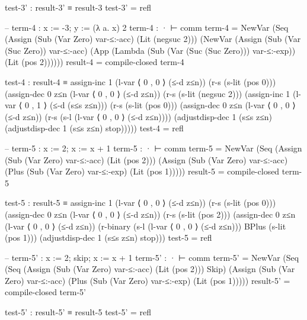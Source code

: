 \documentclass{article}
\begin{document}
\begin{prev}
\begin{code}
test-3' : result-3' ≡ result-3
test-3' = refl


-- term-4 : x := -3; y := (λ a. x) 2
term-4 : · ⊢ comm
term-4 = 
    NewVar 
        (Seq 
            (Assign 
                (Sub (Var Zero) var-≤:-acc) 
                (Lit (negsuc 2)))
            (NewVar 
                (Assign 
                    (Sub (Var (Suc Zero)) var-≤:-acc)
                    (App 
                        (Lambda (Sub (Var (Suc (Suc Zero))) var-≤:-exp))
                        (Lit (pos 2))))))
result-4 = compile-closed term-4

test-4 : result-4 ≡
    assign-inc 1 
    (l-var ⟨ 0 , 0 ⟩ (≤-d z≤n)) 
    (r-s (s-lit (pos 0)))
    (assign-dec 0 z≤n 
        (l-var ⟨ 0 , 0 ⟩ (≤-d z≤n))
        (r-s (s-lit (negsuc 2)))
        (assign-inc 1 
            (l-var ⟨ 0 , 1 ⟩ (≤-d (s≤s z≤n)))
            (r-s (s-lit (pos 0)))
            (assign-dec 0 z≤n 
                (l-var ⟨ 0 , 0 ⟩ (≤-d z≤n))
                (r-s (s-l (l-var ⟨ 0 , 0 ⟩ (≤-d z≤n))))
                (adjustdisp-dec 1 (s≤s z≤n)
                    (adjustdisp-dec 1 (s≤s z≤n) stop)))))
test-4 = refl


-- term-5 : x := 2; x := x + 1
term-5 : · ⊢ comm
term-5 = 
    NewVar 
        (Seq 
            (Assign 
                (Sub (Var Zero) var-≤:-acc) 
                (Lit (pos 2))) 
            (Assign 
                (Sub (Var Zero) var-≤:-acc)
                (Plus 
                    (Sub (Var Zero) var-≤:-exp) 
                    (Lit (pos 1)))))
result-5 = compile-closed term-5

test-5 : result-5 ≡ 
    assign-inc 1 
    (l-var ⟨ 0 , 0 ⟩ (≤-d z≤n)) 
    (r-s (s-lit (pos 0)))
    (assign-dec 0 z≤n 
        (l-var ⟨ 0 , 0 ⟩ (≤-d z≤n)) 
        (r-s (s-lit (pos 2)))
        (assign-dec 0 z≤n 
            (l-var ⟨ 0 , 0 ⟩ (≤-d z≤n))
            (r-binary 
                (s-l (l-var ⟨ 0 , 0 ⟩ (≤-d z≤n))) 
                BPlus 
                (s-lit (pos 1)))
            (adjustdisp-dec 1 (s≤s z≤n) stop)))
test-5 = refl

-- term-5' : x := 2; skip; x := x + 1
term-5' : · ⊢ comm
term-5' = 
    NewVar 
        (Seq 
            (Seq 
                (Assign 
                    (Sub (Var Zero) var-≤:-acc) 
                    (Lit (pos 2))) 
                Skip)
            (Assign 
                (Sub (Var Zero) var-≤:-acc)
                (Plus 
                    (Sub (Var Zero) var-≤:-exp) 
                    (Lit (pos 1)))))
result-5' = compile-closed term-5'

test-5' : result-5' ≡ result-5
test-5' = refl



\end{code}
\end{prev}
\end{document}
